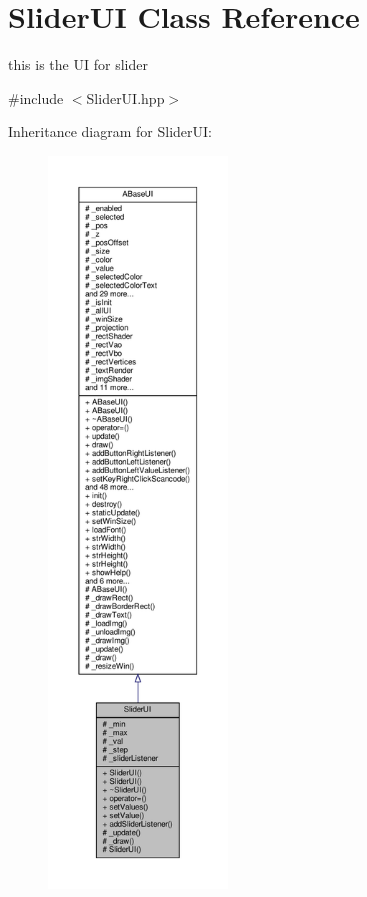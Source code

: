 \hypertarget{class_slider_u_i}{}\section{Slider\+UI Class Reference}
\label{class_slider_u_i}


this is the UI for slider  




{\ttfamily \#include $<$Slider\+U\+I.\+hpp$>$}



Inheritance diagram for Slider\+UI\+:
\nopagebreak
\begin{figure}[H]
\begin{center}
\leavevmode
\includegraphics[height=550pt]{class_slider_u_i__inherit__graph}
\end{center}
\end{figure}


